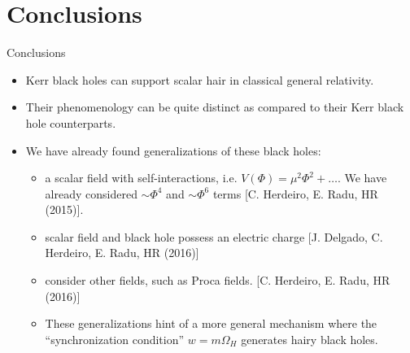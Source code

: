 \documentclass[xcolor=dvipsnames]{beamer}
\begin{document}
\section{Conclusions}

\begin{frame}{Conclusions}
  \begin{itemize}[<+->]
    \item Kerr black holes can support scalar hair in classical general relativity.
    \item Their phenomenology can be quite distinct as compared to their Kerr black hole counterparts.
    \item We have already found generalizations of these black holes:
      \begin{itemize}
        \item a scalar field with self-interactions, i.e. $V(\Phi)=\mu^2\Phi^2+\ldots$. We have already considered $\sim\Phi^4$ and $\sim\Phi^6$ terms \tiny{[C. Herdeiro, E. Radu, HR (2015)]}.
        \item scalar field and black hole possess an electric charge \tiny{[J. Delgado, C. Herdeiro, E. Radu, HR (2016)]}
        \item consider other fields, such as Proca fields. \tiny{[C. Herdeiro, E. Radu, HR (2016)]}
        \item These generalizations hint of a more general mechanism where the ``synchronization condition'' $w=m\Omega_H$ generates hairy black holes.
      \end{itemize}
  \end{itemize}
\end{frame}
\end{document}
